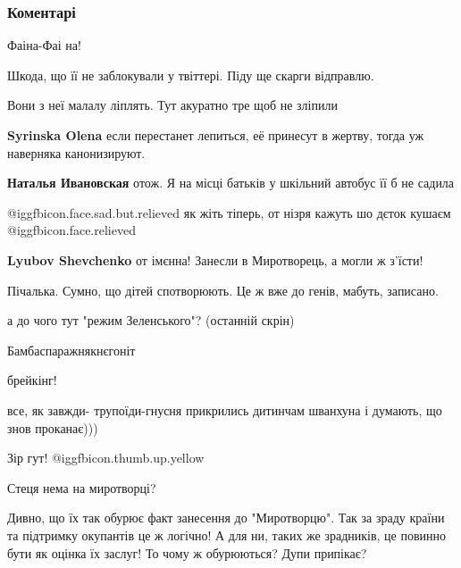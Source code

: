  
 
 
 
 
\subsubsection{Коментарі}
\label{sec:12_10_2021.fb.zajcev_roman_vladimirovich.1.savenkova.cmt}

\begin{itemize} %
Фаіна-Фаі на!

Шкода, що її не заблокували у твіттері. Піду ще скарги відправлю.

Вони з неї малалу ліплять. Тут акуратно тре щоб не зліпили

\begin{itemize} %
\textbf{Syrinska Olena} если перестанет лепиться, её принесут в жертву, тогда уж наверняка канонизируют.

\textbf{Наталья Ивановская} отож. Я на місці батьків у шкільний автобус її б не садила
\end{itemize} %

 @igg{fbicon.face.sad.but.relieved} як жіть тіперь, от нізря кажуть шо дєток кушаєм  @igg{fbicon.face.relieved} 

\begin{itemize} %
\textbf{Lyubov Shevchenko} от імєнна! Занесли в Миротворець, а могли ж з'їсти!
\end{itemize} %

Пічалька. Сумно, що дітей спотворюють. Це ж вже до генів, мабуть, записано.

а до чого тут "режим Зеленського"? (останній скрін)

Бамбаспаражнякнєгоніт

брейкінг!

все, як завжди- трупоїди-гнусня прикрились дитинчам шванхуна і думають, що знов проканає)))

Зір гут!  @igg{fbicon.thumb.up.yellow} 


Стеця нема на миротворці?


Дивно, що їх так обурює факт занесення до "Миротворцю". Так за зраду країни та
підтримку окупантів це ж логічно! А для ни, таких же зрадників, це повинно бути
як оцінка їх заслуг! То чому ж обурюються? Дупи припікає?


\end{itemize} %
